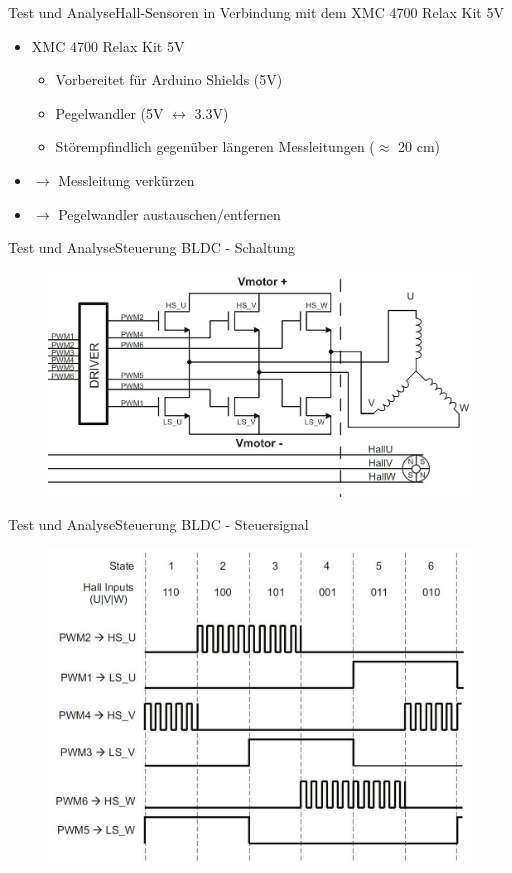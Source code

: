 \begin{frame}{Test und Analyse}{Hall-Sensoren in Verbindung mit dem XMC 4700 Relax Kit 5V}
	\begin{itemize}
		\item XMC 4700 Relax Kit 5V
		\begin{itemize}
			\item Vorbereitet für Arduino Shields (5V)
			\item Pegelwandler (5V $\leftrightarrow$ 3.3V)
			\item Störempfindlich gegenüber längeren Messleitungen ($\approx$ 20 cm)
		\end{itemize}
		\item $\rightarrow$ Messleitung verkürzen
		\item $\rightarrow$ Pegelwandler austauschen/entfernen
	\end{itemize}
\end{frame}

\begin{frame}{Test und Analyse}{Steuerung BLDC - Schaltung}
	\begin{figure}
		\includegraphics[width=\textwidth]{Test/Aufbau_Ansteuerung_Motor}
	\end{figure}
\end{frame}

\begin{frame}{Test und Analyse}{Steuerung BLDC - Steuersignal}
	\begin{figure}
		\includegraphics[height=0.8\textheight]{Test/Ansteuerung_H-Bruecke}
	\end{figure}
\end{frame}

